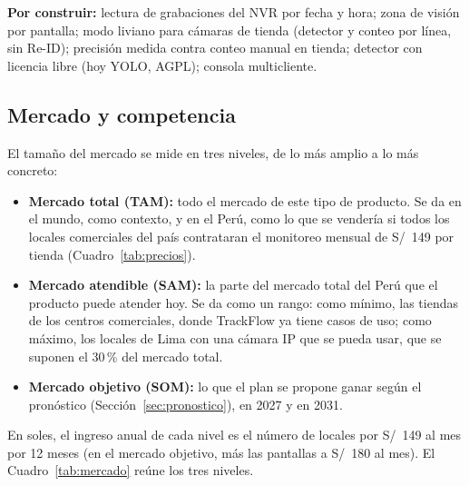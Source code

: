 \documentclass[12pt,a4paper]{article}
\begin{document}
\textbf{Por construir:} lectura de grabaciones del NVR por fecha y hora; zona
de visión por pantalla; modo liviano para cámaras de tienda (detector y conteo
por línea, sin Re-ID); precisión medida contra conteo manual en
tienda; detector con licencia libre (hoy YOLO, AGPL); consola multicliente.

\subsection{Mercado y competencia}

El tamaño del mercado se mide en tres niveles, de lo más amplio a lo más
concreto:

\begin{itemize}
    \item \textbf{Mercado total (TAM):} todo el mercado de este tipo de producto. Se
    da en el mundo, como contexto, y en el Perú, como lo que se vendería si
    todos los locales comerciales del país contrataran el monitoreo mensual de
    S/~149 por tienda (Cuadro~\ref{tab:precios}).
    \item \textbf{Mercado atendible (SAM):} la parte del mercado total del Perú que
    el producto puede atender hoy. Se da como un rango: como mínimo, las
    tiendas de los centros comerciales, donde TrackFlow ya tiene casos de uso;
    como máximo, los locales de Lima con una cámara IP que se pueda usar, que
    se suponen el 30\,\% del mercado total.
    \item \textbf{Mercado objetivo (SOM):} lo que el plan se propone ganar según el
    pronóstico (Sección~\ref{sec:pronostico}), en 2027 y en 2031.
\end{itemize}

En soles, el ingreso anual de cada nivel es el número de locales por S/~149 al
mes por 12 meses (en el mercado objetivo, más las pantallas a S/~180 al mes).
El Cuadro~\ref{tab:mercado} reúne los tres niveles.
\end{document}
